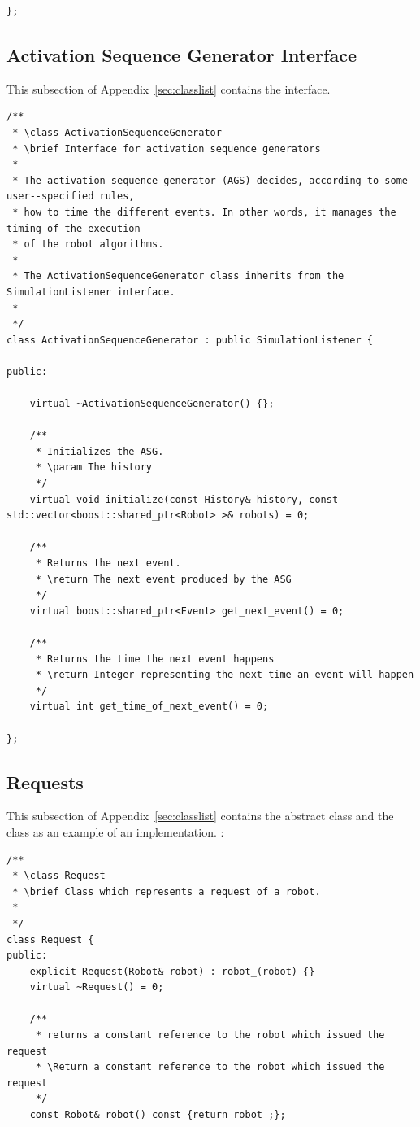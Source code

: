 \begin{appendix}
\begin{lstlisting}
};
\end{lstlisting}

\subsection{Activation Sequence Generator Interface}\label{appendix:asg}
This subsection of Appendix~\ref{sec:classlist} contains the  interface.
\begin{lstlisting}
/**
 * \class ActivationSequenceGenerator
 * \brief Interface for activation sequence generators
 *
 * The activation sequence generator (AGS) decides, according to some user--specified rules,
 * how to time the different events. In other words, it manages the timing of the execution
 * of the robot algorithms.
 *
 * The ActivationSequenceGenerator class inherits from the SimulationListener interface.
 *
 */
class ActivationSequenceGenerator : public SimulationListener {

public:

	virtual ~ActivationSequenceGenerator() {};

	/**
	 * Initializes the ASG.
	 * \param The history
	 */
	virtual void initialize(const History& history, const std::vector<boost::shared_ptr<Robot> >& robots) = 0;

	/**
	 * Returns the next event.
	 * \return The next event produced by the ASG
	 */
	virtual boost::shared_ptr<Event> get_next_event() = 0;

	/**
	 * Returns the time the next event happens
	 * \return Integer representing the next time an event will happen
	 */
	virtual int get_time_of_next_event() = 0;

};
\end{lstlisting}


\subsection{Requests}\label{appendix:requests}
This subsection of Appendix~\ref{sec:classlist} contains the abstract  class and the  class as an example of an implementation.
:
\begin{lstlisting}
/**
 * \class Request
 * \brief Class which represents a request of a robot.
 *
 */
class Request {
public:
	explicit Request(Robot& robot) : robot_(robot) {}
	virtual ~Request() = 0;

	/**
	 * returns a constant reference to the robot which issued the request
	 * \Return a constant reference to the robot which issued the request
	 */
	const Robot& robot() const {return robot_;};


\end{lstlisting}
\end{appendix}
